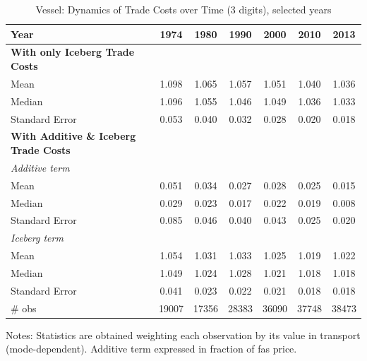 \documentclass[a4paper,11pt]{article}
\begin{document}
\begin{table}[htbp]
  \centering
  \caption{Vessel: Dynamics of Trade Costs over Time (3 digits), selected years}
\begin{center}
    \begin{tabular}{l|cccccc}
   \hline\hline
Year         & 1974  & 1980  & 1990  & 2000  & 2010  & 2013   \\
 \hline
   \textbf{With only Iceberg Trade Costs} &       &       &       &       &       &       \\
Mean  & 1.098 & 1.065 & 1.057 & 1.051 & 1.040 & 1.036  \\
Median & 1.096 & 1.055 & 1.046 & 1.049 & 1.036 & 1.033  \\
Standard Error & 0.053 & 0.040 & 0.032 & 0.028 & 0.020 & 0.018  \\
\textbf{With Additive \& Iceberg Trade Costs} &       &       &       &       &       &     \\
\hline
\textit{Additive term } &       &       &       &       &       &        \\
Mean  & 0.051 & 0.034 & 0.027 & 0.028 & 0.025 & 0.015  \\
Median & 0.029 & 0.023 & 0.017 & 0.022 & 0.019 & 0.008 \\
Standard Error & 0.085 & 0.046 & 0.040 & 0.043 & 0.025 & 0.020 \\
\textit{Iceberg term} &       &       &       &       &       &        \\
Mean  & 1.054 & 1.031 & 1.033 & 1.025 & 1.019 & 1.022 \\
Median & 1.049 & 1.024 & 1.028 & 1.021 & 1.018 & 1.018  \\
Standard Error & 0.041 & 0.023 & 0.022 & 0.021 & 0.018 & 0.018  \\
\hline
 \# obs & 19007 & 17356 & 28383 & 36090 & 37748 & 38473 \\ \hline
\hline\hline
    \end{tabular}%
  \end{center}
  \label{tab:result_ves_3d_detail}%
\tiny{Notes: Statistics are obtained weighting each observation by its value in transport (mode-dependent). Additive term expressed in fraction of fas price. }
\end{table}%
\end{document}
